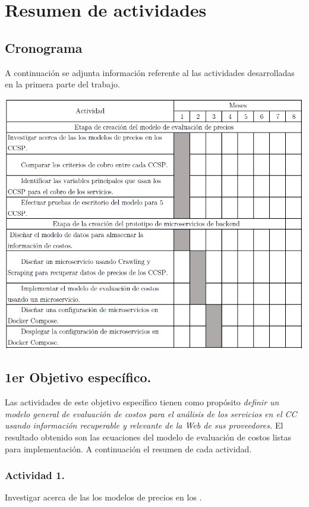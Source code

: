
\chapter{Resumen de actividades} %

\label{ch:metodologia} %
\section{Cronograma}
A continuación se adjunta información referente al las actividades desarrolladas en la primera parte del trabajo.
\begin{center}
    \includegraphics[width=\textwidth]{gfx/actividades.png}
\end{center}

\section{1er Objetivo específico.}
Las actividades de este objetivo específico tienen como propósito \emph{definir un modelo general de evaluación de costos para el análisis de los servicios en el \acrshort{CC} usando información recuperable y relevante de la Web de sus proveedores.} El resultado obtenido son las ecuaciones del modelo de evaluación de costos listas para implementación. A continuación el resumen de cada actividad.

\subsection{Actividad 1.}
Investigar acerca de las los modelos de precios en los .


